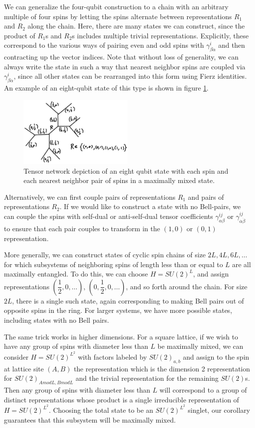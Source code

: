\documentclass[12pt]{article}
\theoremstyle{definition}
\begin{document}
We can generalize the four-qubit construction to a chain with an arbitrary multiple of four spins by letting the spins alternate between representations $R_1$ and $R_2$ along the chain. Here, there are many states we can construct, since the product of $R_1$s and $R_2$s includes multiple trivial representations. Explicitly, these correspond to the various ways of pairing even and odd spins with $\gamma^i_{\beta \dot{\alpha}}$ and then contracting up the vector indices. Note that without loss of generality, we can always write the state in such a way that nearest neighbor spins are coupled via $\gamma^i_{\beta \dot{\alpha}}$, since all other states can be rearranged into this form using Fierz identities. An example of an eight-qubit state of this type is shown in figure \ref{group2}.
\begin{figure}
\centering
\includegraphics[width=0.5\textwidth]{group2.eps}
\caption{Tensor network depiction of an eight qubit state with each spin and each nearest neighbor pair of spins in a maximally mixed state. }
\label{group2}
\end{figure}
Alternatively, we can first couple pairs of representations $R_1$ and pairs of representations $R_2$. If we would like to construct a state with no Bell-pairs, we can couple the spins with self-dual or anti-self-dual tensor coefficients $\gamma^{ij}_{\alpha \beta}$ or $\gamma^{ij}_{\dot{\alpha} \dot{\beta}}$ to ensure that each pair couples to transform in the $(1,0)$ or $(0,1)$ representation.

More generally, we can construct states of cyclic spin chains of size $2L,4L,6L,\dots$ for which subsystems of neighboring spins of length less than or equal to $L$ are all maximally entangled. To do this, we can choose $H = SU(2)^L$, and assign representations $(\dfrac{1}{2}, 0,\dots)$, $(0, \dfrac{1}{2}, 0,\dots)$, and so forth around the chain. For size $2L$, there is a single such state, again corresponding to making Bell pairs out of opposite spins in the ring. For larger systems, we have more possible states, including states with no Bell pairs.

The same trick works in higher dimensions. For a square lattice, if we wish to have any group of spins with diameter less than $L$ be maximally mixed, we can consider $H = SU(2)^{L^2}$ with factors labeled by $SU(2)_{a,b}$ and assign to the spin at lattice site $(A,B)$ the representation which is the dimension 2 representation for $SU(2)_{A mod L, B mod L}$ and the trivial representation for the remaining $SU(2)$s. Then any group of spins with diameter less than $L$ will correspond to a group of distinct representations whose product is a single irreducible representation of $H = SU(2)^{L^2}$. Choosing the total state to be an $SU(2)^{L^2}$ singlet, our corollary guarantees that this subsystem will be maximally mixed.
\end{document}
